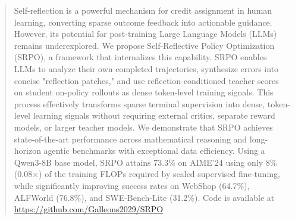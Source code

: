 \documentclass{article}
\theoremstyle{plain}
\theoremstyle{definition}
\theoremstyle{remark}
\begin{document}



\printAffiliationsAndNotice{}  %

\begin{abstract}
Self-reflection is a powerful mechanism for credit assignment in human learning, 
converting sparse outcome feedback into actionable guidance. However, its 
potential for post-training Large Language Models (LLMs) remains underexplored. 
We propose Self-Reflective Policy Optimization (SRPO), a framework that 
internalizes this capability. SRPO enables LLMs to analyze their own completed 
trajectories, synthesize errors into concise "reflection patches," and 
use reflection-conditioned teacher scores on student on-policy rollouts as dense token-level training signals.
This process effectively transforms sparse terminal supervision into dense, 
token-level learning signals without requiring external critics, separate 
reward models, or larger teacher models. We demonstrate that SRPO achieves 
state-of-the-art performance across mathematical reasoning and long-horizon 
agentic benchmarks with exceptional data efficiency. Using a Qwen3-8B base 
model, SRPO attains 73.3\% on AIME’24 using only 8\% (0.08$\times$) of the 
training FLOPs required by scaled supervised fine-tuning, while significantly 
improving success rates on WebShop (64.7\%), ALFWorld (76.8\%), and 
SWE-Bench-Lite (31.2\%). Code is available at \url{https://github.com/Galleons2029/SRPO}
\end{abstract}
\end{document}
